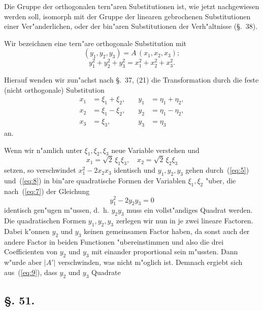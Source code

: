 \documentclass[12pt,a4paper]{article}
\theoremstyle{weber}
\begin{document}
\bigskip

Die Gruppe der orthogonalen tern"aren Substitutionen ist, wie jetzt nachgewiesen werden soll, isomorph mit der Gruppe der linearen gebrochenen Substitutionen einer Ver"anderlichen, oder der bin"aren Substitutionen der Verh"altnisse (\S.~38).

Wir bezeichnen eine tern"are orthogonale Substitution mit
\begin{equation}\label{eq:1}
(y_1, y_2, y_3) = A\,(x_1, x_2, x_3);
\end{equation}
\begin{equation}\label{eq:2}
y_1^2 + y_2^2 + y_3^2 = x_1^2 + x_2^2 + x_3^2.
\end{equation}

Hierauf wenden wir zun"achst nach \S.~37, (21) die Transformation durch die feste (nicht orthogonale) Substitution
\begin{equation}\label{eq:3}
\begin{aligned}
x_1 &= \xi_1 + \xi_2, &\quad y_1 &= \eta_1 + \eta_2, \\
x_2 &= \xi_1 - \xi_2, &\quad y_2 &= \eta_1 - \eta_2, \\
x_3 &= \xi_3, &\quad y_3 &= \eta_3
\end{aligned}
\end{equation}
an.

Wenn wir n"amlich unter $\xi_1, \xi_2, \xi_3$ neue Variable verstehen und
\begin{equation}\label{eq:8}
x_1 = \sqrt{2}\,\xi_1\xi_3,\quad x_2 = \sqrt{2}\,\xi_2\xi_3
\end{equation}
setzen, so verschwindet $x_1^2 - 2x_2x_3$ identisch und $y_1, y_2, y_3$ gehen durch~(\ref{eq:5}) und~(\ref{eq:8}) in bin"are quadratische Formen der Variablen $\xi_1, \xi_2$ "uber, die nach~(\ref{eq:7}) der Gleichung
\begin{equation}\label{eq:9}
y_1^2 - 2y_2y_3 = 0
\end{equation}
identisch gen"ugen m"ussen, d.~h. $y_2 y_3$ muss ein vollst"andiges Quadrat werden. Die quadratischen Formen $y_1, y_2, y_3$ zerlegen wir nun in je zwei lineare Factoren. Dabei k"onnen $y_2$ und $y_3$ keinen gemeinsamen Factor haben, da sonst auch der andere Factor in beiden Functionen "ubereinstimmen und also die drei Coefficienten von $y_2$ und $y_3$ mit einander proportional sein m"ussten. Dann w"urde aber $|A'|$ verschwinden, was nicht m"oglich ist. Demnach ergiebt sich aus~(\ref{eq:9}), dass $y_2$ und $y_3$ Quadrate


\newpage
\subsection*{\S. 51.}
\end{document}

